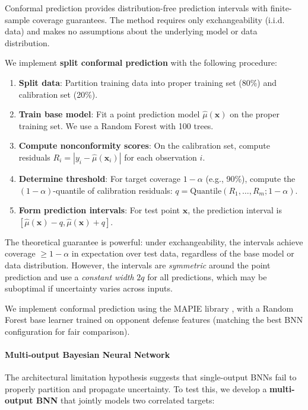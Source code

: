 Conformal prediction \citep{vovk2005algorithmic, shafer2008tutorial} provides distribution-free prediction intervals with finite-sample coverage guarantees. The method requires only exchangeability (i.i.d. data) and makes no assumptions about the underlying model or data distribution.

We implement \textbf{split conformal prediction} with the following procedure:

\begin{enumerate}
    \item \textbf{Split data}: Partition training data into proper training set (80\%) and calibration set (20\%).
    \item \textbf{Train base model}: Fit a point prediction model $\hat{\mu}(\mathbf{x})$ on the proper training set. We use a Random Forest with 100 trees.
    \item \textbf{Compute nonconformity scores}: On the calibration set, compute residuals $R_i = |y_i - \hat{\mu}(\mathbf{x}_i)|$ for each observation $i$.
    \item \textbf{Determine threshold}: For target coverage $1 - \alpha$ (e.g., 90\%), compute the $(1-\alpha)$-quantile of calibration residuals: $q = \text{Quantile}(R_1, \ldots, R_m; 1-\alpha)$.
    \item \textbf{Form prediction intervals}: For test point $\mathbf{x}$, the prediction interval is $[\hat{\mu}(\mathbf{x}) - q, \hat{\mu}(\mathbf{x}) + q]$.
\end{enumerate}

The theoretical guarantee is powerful: under exchangeability, the intervals achieve coverage $\geq 1 - \alpha$ in expectation over test data, regardless of the base model or data distribution. However, the intervals are \textit{symmetric} around the point prediction and use a \textit{constant width} $2q$ for all predictions, which may be suboptimal if uncertainty varies across inputs.

We implement conformal prediction using the MAPIE library \citep{taquet2021mapie}, with a Random Forest base learner trained on opponent defense features (matching the best BNN configuration for fair comparison).

\paragraph{Multi-output Bayesian Neural Network}

The architectural limitation hypothesis suggests that single-output BNNs fail to properly partition and propagate uncertainty. To test this, we develop a \textbf{multi-output BNN} that jointly models two correlated targets:

